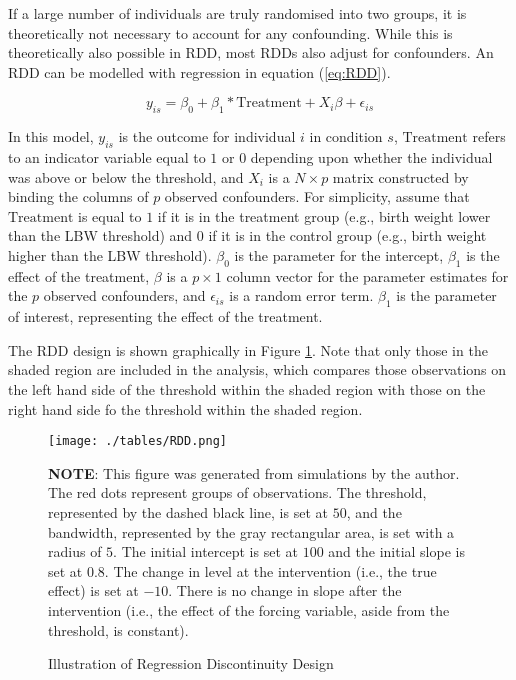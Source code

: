\documentclass[12pt]{article}
\begin{document}
If a large number of individuals are truly randomised into two groups, it is theoretically not necessary to account for any confounding. While this is theoretically also possible in RDD, most RDDs also adjust for confounders. An RDD can be modelled with regression in equation (\ref{eq:RDD}).

\begin{equation}\label{eq:RDD}
  y_{is} = \beta_0 + \beta_1 * \textrm{Treatment} + X_{i}\beta + \epsilon_{is}
\end{equation}

In this model, $y_{is}$ is the outcome for individual $i$ in condition $s$, $\textrm{Treatment}$ refers to an indicator variable equal to $1$ or $0$ depending upon whether the individual was above or below the threshold, and $X_i$ is a $N \times p$ matrix constructed by binding the columns of $p$ observed confounders. For simplicity, assume that $\textrm{Treatment}$ is equal to $1$ if it is in the treatment group (e.g., birth weight lower than the LBW threshold) and $0$ if it is in the control group (e.g., birth weight higher than the LBW threshold). $\beta_0$ is the parameter for the intercept, $\beta_1$ is the effect of the treatment, $\beta$ is a $p \times 1$ column vector for the parameter estimates for the $p$ observed confounders, and $\epsilon_{is}$ is a random error term. $\beta_1$ is the parameter of interest, representing the effect of the treatment.

The RDD design is shown graphically in Figure \ref{fig:RDD}. Note that only those in the shaded region are included in the analysis, which compares those observations on the left hand side of the threshold within the shaded region with those on the right hand side fo the threshold within the shaded region.


\begin{figure}
    \centering
    \caption{Illustration of Regression Discontinuity Design}
    \texttt{[image: ./tables/RDD.png]}
    \begin{minipage}{\textwidth}
    \footnotesize
    \textbf{NOTE}: This figure was generated from simulations by the author. The red dots represent groups of observations. The threshold, represented by the dashed black line, is set at $50$, and the bandwidth, represented by the gray rectangular area, is set with a radius of $5$. The initial intercept is set at $100$ and the initial slope is set at $0.8$. The change in level at the intervention (i.e., the true effect) is set at $-10$. There is no change in slope after the intervention (i.e., the effect of the forcing variable, aside from the threshold, is constant).
    \end{minipage}
    \label{fig:RDD}
\end{figure}
\end{document}
